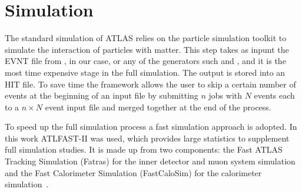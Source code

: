 \section{Simulation}
The standard simulation of ATLAS relies on the \geant particle simulation toolkit to simulate the interaction of particles with matter. This step takes as inpunt the EVNT file from \PYTHIA, in our case, or any of the generators such \HERWIG and \SHERPA, and it is the most time expensive stage in the full simulation. The output is stored into an HIT file. To save time the framework allows the user to skip a certain number of events at the beginning of an input file by submitting $n$ jobs with $N$ events each to a $n\times N$ event input file and merged together at the end of the process.



To speed up the full simulation process a fast simulation approach is adopted. In this work ATLFAST-II was used, which provides large statistics to supplement full simulation studies. It is made up from two components: the Fast ATLAS Tracking Simulation (Fatras) for the inner detector and muon system simulation and the Fast Calorimeter Simulation (FastCaloSim) for the calorimeter simulation~\cite{simulation}. 

